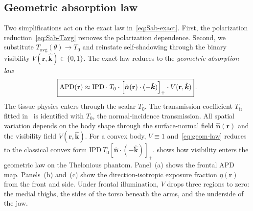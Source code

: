 \documentclass[journal,twocolumn,10pt]{IEEEtran}
\newcommand{\khat}{\hat{\bm{k}}}
\newcommand{\nhat}{\hat{\bm{n}}}
\newcommand{\rr}{\mathbf{r}}
\newcommand{\IPD}{\mathrm{IPD}}
\newcommand{\APD}{\mathrm{APD}}
\newcommand{\Tavg}{T_{\mathrm{avg}}}
\newcommand{\pospart}[1]{\left[#1\right]_{+}}
\newcommand{\Vis}{V}
\begin{document}
\subsection{Geometric absorption law}\label{subsec:pB-geom}

Two simplifications act on the exact law in~\eqref{eq:Sab-exact}.
First, the polarization reduction~\eqref{eq:Sab-Tavg} removes the
polarization dependence. Second, we substitute $\Tavg(\theta) \to T_0$ and reinstate
self-shadowing through the binary visibility
$\Vis(\rr,\khat) \in \{0,1\}$. The exact law reduces to the
\textit{geometric absorption law}
\begin{equation}\label{eq:geom-law}
  \boxed{%
    \APD(\rr) \approx \IPD \cdot T_0 \cdot \pospart{\nhat(\rr) \cdot (-\khat)} \cdot
    \Vis(\rr,\khat)
  }\, .
\end{equation}
The tissue physics enters through the scalar $T_0$. The transmission
coefficient $T_{\mathrm{tr}}$ fitted
in~\cite{Kodera2024,Diao2024,Funahashi2018} is identified with $T_0$,
the normal-incidence transmission. All spatial
variation depends on the body shape through the surface-normal field
$\nhat(\rr)$ and the visibility field $\Vis(\rr,\khat)$. For a convex
body, $\Vis \equiv 1$ and~\eqref{eq:geom-law} reduces to the classical
convex form $\IPD\,T_0 \pospart{\nhat\cdot(-\khat)}$.
 shows how visibility enters the geometric law on
the Thelonious phantom. Panel~(a) shows the frontal APD map.
Panels~(b) and~(c) show the direction-isotropic exposure fraction
$\eta(\rr)$ from the front and side. Under frontal illumination,
$\Vis$ drops three regions to zero: the medial thighs, the sides of
the torso beneath the arms, and the underside of the jaw.
\end{document}
